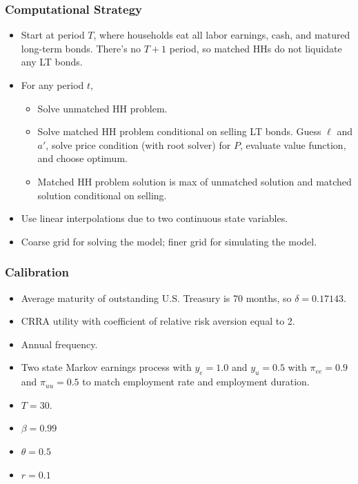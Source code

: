 \documentclass[handout]{beamer}
\begin{document}
\begin{frame}
\frametitle{Computational Strategy}
\begin{itemize}[<+->]
\item Start at period $T$, where households eat all labor earnings, cash, and matured long-term bonds. There's no $T+1$ period, so matched HHs do not liquidate any LT bonds.
\bigskip
\item For any period $t$, 
\begin{itemize}[<+->]
\item Solve unmatched HH problem.
\item Solve matched HH problem conditional on selling LT bonds. Guess $\ell$ and $a'$, solve price condition (with root solver) for $P$, evaluate value function, and choose optimum.
\item Matched HH problem solution is max of unmatched solution and matched solution conditional on selling.
\end{itemize}
\bigskip
\item Use linear interpolations due to two continuous state variables. 
\bigskip
\item Coarse grid for solving the model; finer grid for simulating the model.
\end{itemize}
\end{frame}





\begin{frame}
\frametitle{Calibration}

\begin{itemize}[<+->]

\item Average maturity of outstanding U.S. Treasury is 70 months, so $\delta = 0.17143$. \hyperlink{delta}{ }
\item CRRA utility with coefficient of relative risk aversion equal to 2.
\item Annual frequency.
\item Two state Markov earnings process with $y_e = 1.0$ and $y_u = 0.5$ with $\pi_{ee} = 0.9$ and $\pi_{uu} = 0.5$ to match employment rate and employment duration.
\item $T = 30$.
\item $\beta = 0.99$
\item $\theta = 0.5$
\item $r = 0.1$
\bigskip

\end{itemize}

\end{frame}
\end{document}
